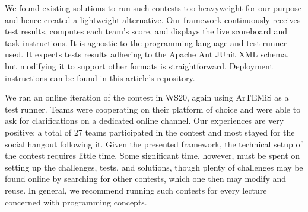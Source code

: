 We found existing solutions
to run such contests too heavyweight for our purpose
and hence created a lightweight alternative.
Our framework continuously receives test results,
computes each team's score,
and displays the live scoreboard and task instructions.
It is agnostic to the programming language and test runner used.
It expects tests results adhering to the Apache Ant JUnit XML schema,
but modifying it to support other formats is straightforward.
Deployment instructions can be found in this article's repository.

We ran an online iteration of the contest in WS20,
again using ArTEMiS as a test runner.
Teams were cooperating on their platform of choice
and were able to ask for clarifications on a dedicated online channel.
Our experiences are very positive:
a total of 27 teams participated in the contest
and most stayed for the social hangout following it.
Given the presented framework,
the technical setup of the contest requires little time.
Some significant time, however,
must be spent on setting up the challenges,
tests, and solutions,
though plenty of challenges may be found
online by searching for other contests,
which one then may modify and reuse.
In general, we recommend running such contests
for every lecture concerned with programming concepts.



